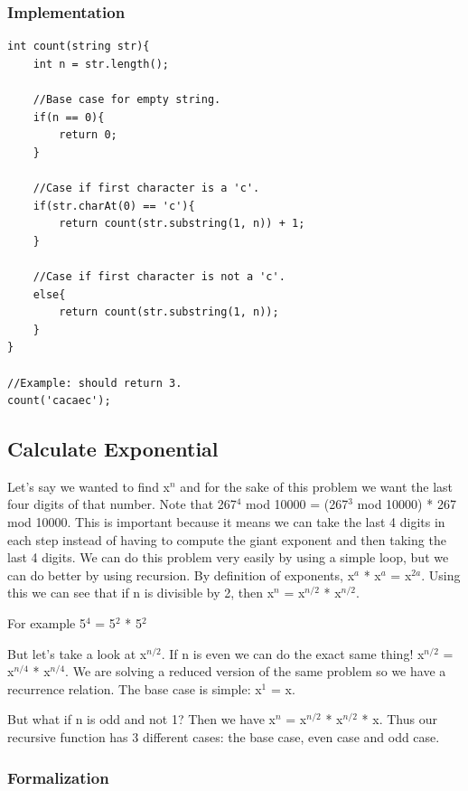 \documentclass[11pt,oneside]{book}
\begin{document}
\subsubsection{Implementation}

\begin{lstlisting}
int count(string str){
    int n = str.length();

    //Base case for empty string.
    if(n == 0){
        return 0;
    }

    //Case if first character is a 'c'.
    if(str.charAt(0) == 'c'){
        return count(str.substring(1, n)) + 1;
    }

    //Case if first character is not a 'c'.
    else{
        return count(str.substring(1, n));
    }
}

//Example: should return 3.
count('cacaec');

\end{lstlisting}

\subsection{Calculate Exponential}

Let's say we wanted to find x$^{n}$ and for the sake of this problem we want the last four digits of that number. Note that 267$^{4}$ mod 10000 = (267$^{3}$ mod 10000) * 267 mod 10000. This is important because it means we can take the last 4 digits in each step instead of having to compute the giant exponent and then taking the last 4 digits. We can do this problem very easily by using a simple loop, but we can do better by using recursion. By definition of exponents, x$^{a}$ * x$^{a}$ = x$^{2a}$. Using this we can see that if n is divisible by 2, then x$^{n}$ = x$^{n/2}$ * x$^{n/2}$.

For example 5$^{4}$ = 5$^{2}$ * 5$^{2}$

But let's take a look at x$^{n/2}$. If n is even we can do the exact same thing! x$^{n/2}$ = x$^{n/4}$ * x$^{n/4}$. We are solving a reduced version of the same problem so we have a recurrence relation. The base case is simple: x$^{1}$ = x.

But what if n is odd and not 1? Then we have x$^{n}$ = x$^{n/2}$ * x$^{n/2}$ * x. Thus our recursive function has 3 different cases: the base case, even case and odd case.

\subsubsection{Formalization}
\end{document}
